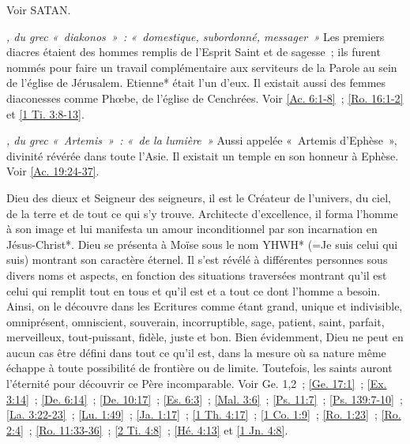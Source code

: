 \begin{multicols}{2}
\textit{}\newline
Voir SATAN.

\textit{, du grec «~diakonos~»~: «~domestique, subordonné, messager~»}\newline
Les premiers diacres étaient des hommes remplis de l'Esprit Saint et de sagesse~; ils furent nommés pour faire un travail complémentaire aux serviteurs de la Parole au sein de l'église de Jérusalem. Etienne* était l'un d'eux. Il existait aussi des femmes diaconesses comme Phœbe, de l'église de Cenchrées. Voir \vref{Ac. 6:1-8}~; \vref{Ro. 16:1-2} et \vref{1 Ti. 3:8-13}.

\textit{, du grec «~Artemis~»~: «~de la lumière~»}\newline
Aussi appelée «~Artemis d'Ephèse~», divinité révérée dans toute l'Asie. Il existait un temple en son honneur à Ephèse. Voir \vref{Ac. 19:24-37}.

\textit{}\newline
Dieu des dieux et Seigneur des seigneurs, il est le Créateur de l'univers, du ciel, de la terre et de tout ce qui s'y trouve. Architecte d'excellence, il forma l'homme à son image et lui manifesta un amour inconditionnel par son incarnation en Jésus-Christ*. Dieu se présenta à Moïse sous le nom YHWH* (=Je suis celui qui suis) montrant son caractère éternel. Il s'est révélé à différentes personnes sous divers noms et aspects, en fonction des situations traversées montrant qu'il est celui qui remplit tout en tous et qu'il est et a tout ce dont l'homme a besoin. Ainsi, on le découvre dans les Ecritures comme étant grand, unique et indivisible, omniprésent, omniscient, souverain, incorruptible, sage, patient, saint, parfait, merveilleux, tout-puissant, fidèle, juste et bon. Bien évidemment, Dieu ne peut en aucun cas être défini dans tout ce qu'il est, dans la mesure où sa nature même échappe à toute possibilité de frontière ou de limite. Toutefois, les saints auront l'éternité pour découvrir ce Père incomparable. Voir Ge. 1,2~; \vref{Ge. 17:1}~; \vref{Ex. 3:14}~; \vref{De. 6:14}~; \vref{De. 10:17}~; \vref{Es. 6:3}~; \vref{Mal. 3:6}~; \vref{Ps. 11:7}~; \vref{Ps. 139:7-10}~; \vref{La. 3:22-23}~; \vref{Lu. 1:49}~; \vref{Ja. 1:17}~; \vref{1 Th. 4:17}~; \vref{1 Co. 1:9}~; \vref{Ro. 1:23}~; \vref{Ro. 2:4}~; \vref{Ro. 11:33-36}~; \vref{2 Ti. 4:8}~; \vref{Hé. 4:13} et \vref{1 Jn. 4:8}.


\end{multicols}
